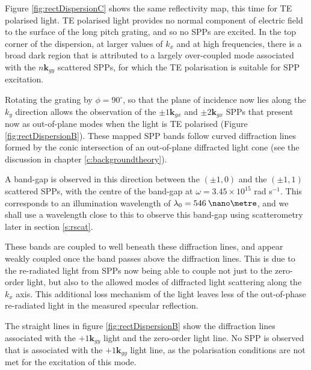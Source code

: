 Figure \ref{fig:rectDispersionC} shows the same reflectivity map, this time for TE polarised light. TE polarised light provides no normal component of electric field to the surface of the long pitch grating, and so no SPPs are excited. In the top corner of the dispersion, at larger values of $k_x$ and at high frequencies, there is a broad dark region that is attributed to a largely over-coupled mode associated with the $n\mathbf{k}_{gy}$ scattered SPPs, for which the TE polarisation is suitable for SPP excitation. 

Rotating the grating by $\phi=90^\circ$, so that the plane of incidence now lies along the $k_y$ direction allows the observation of the $\pm1\mathbf{k}_{gx}$ and $\pm 2\mathbf{k}_{gx}$ SPPs that present now as out-of-plane modes when the light is TE polarised (Figure \ref{fig:rectDispersionB}). These mapped SPP bands follow curved diffraction lines formed by the conic intersection of an out-of-plane diffracted light cone (see the discussion in chapter \ref{c:backgroundtheory}). 

A band-gap is observed in this direction between the $(\pm 1,0)$ and the $(\pm 1,1)$ scattered SPPs, with the centre of the band-gap at $\omega=3.45 \times 10^{15}$ rad s$^{-1}$. This corresponds to an illumination wavelength of $\lambda_0=546\:\nano\metre$, and we shall use a wavelength close to this to observe this band-gap using scatterometry later in section \ref{s:rscat}.

These bands are coupled to well beneath these diffraction lines, and appear weakly coupled once the band passes above the diffraction lines. This is due to the re-radiated light from SPPs now being able to couple not just to the zero-order light, but also to the allowed modes of diffracted light scattering along the $k_x$ axis. This additional loss mechanism of the light leaves less of the out-of-phase re-radiated light in the measured specular reflection. 

The straight lines in figure \ref{fig:rectDispersionB} show the diffraction lines associated with the $+1\mathbf{k}_{gy}$ light and the zero-order light line. No SPP is observed that is associated with the  $+1\mathbf{k}_{gy}$  light line, as the polarisation conditions are not met for the excitation of this mode.

